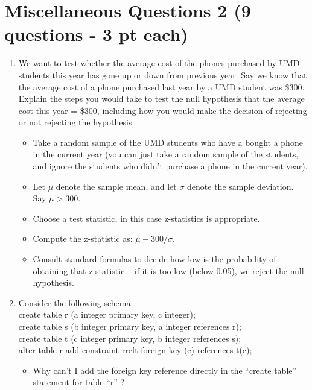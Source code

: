 \documentclass[11pt]{article}
\newcommand{\answer}[2]{\noindent {\bf Answer:} #2}
\begin{document}
\section*{Miscellaneous Questions 2 (9 questions - 3 pt each)}
\begin{enumerate}

\item We want to test whether the average cost of the phones purchased by UMD students this year has gone up or down from previous year. Say we 
know that the average cost of a phone purchased last year by a UMD student was \$300. Explain the steps you would take to test 
the null hypothesis that the average cost this year = \$300, including how you would make the decision of rejecting or not rejecting the hypothesis.

\answer{3.9in}{
    \begin{itemize}
    \item Take a random sample of the UMD students who have a bought a phone in the current year (you can just take a random sample of the students,
            and ignore the students who didn't purchase a phone in the current year).
        \item Let $\mu$ denote the sample mean, and let $\sigma$ denote the sample deviation. Say $\mu > 300$.
        \item Choose a test statistic, in this case z-statistics is appropriate.
        \item Compute the z-statistic as: $\mu - 300/ \sigma$. 
        \item Consult standard formulas to decide how low is the probability of obtaining that z-statistic -- if it is too low (below 0.05), we
        reject the null hypothesis.
    \end{itemize}
}

\item Consider the following schema: \\
        create table r (a integer primary key, c integer); \\
        create table s (b integer primary key, a integer references r); \\
        create table t (c integer primary key, b integer references s); \\
        alter table r add constraint rreft foreign key (c) references t(c);

        \begin{itemize}
            \item Why can't I add the foreign key reference directly in the ``create table'' statement for table ``r'' ?


\end{itemize}
\end{enumerate}
\end{document}
